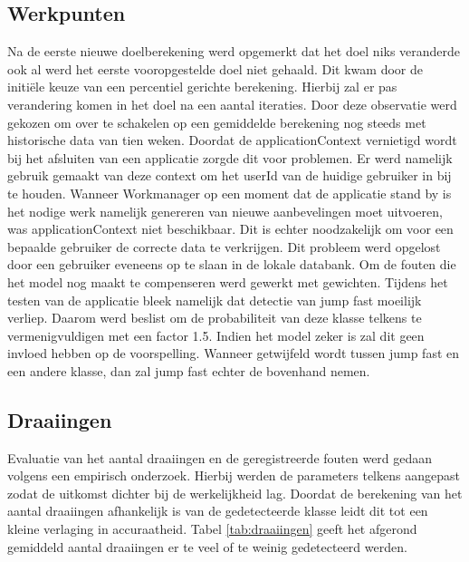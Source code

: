 \subsection{Werkpunten}
Na de eerste nieuwe doelberekening werd opgemerkt dat het doel niks veranderde ook al werd het eerste vooropgestelde doel niet gehaald. Dit kwam door de initiële keuze van een percentiel gerichte berekening. Hierbij zal er pas verandering komen in het doel na een aantal iteraties. Door deze observatie werd gekozen om over te schakelen op een gemiddelde berekening nog steeds met historische data van tien weken. 
Doordat de applicationContext vernietigd wordt bij het afsluiten van een applicatie zorgde dit voor problemen. Er werd namelijk gebruik gemaakt van deze context om het userId van de huidige gebruiker in bij te houden. Wanneer Workmanager op een moment dat de applicatie stand by is het nodige werk namelijk genereren van nieuwe aanbevelingen moet uitvoeren, was applicationContext niet beschikbaar. Dit is echter noodzakelijk om voor een bepaalde gebruiker de correcte data te verkrijgen. Dit probleem werd opgelost door een gebruiker eveneens op te slaan in de lokale databank. 
Om de fouten die het model nog maakt te compenseren werd gewerkt met gewichten. Tijdens het testen van de applicatie bleek namelijk dat detectie van jump fast moeilijk verliep. Daarom werd beslist om de probabiliteit van deze klasse telkens te vermenigvuldigen met een factor 1.5. Indien het model zeker is zal dit geen invloed hebben op de voorspelling. Wanneer getwijfeld wordt tussen jump fast en een andere klasse, dan zal jump fast echter de bovenhand nemen.

\subsection{Draaiingen}
Evaluatie van het aantal draaiingen en de geregistreerde fouten werd gedaan volgens een empirisch onderzoek. Hierbij werden de parameters telkens aangepast zodat de uitkomst dichter bij de werkelijkheid lag. Doordat de berekening van het aantal draaiingen afhankelijk is van de gedetecteerde klasse leidt dit tot een kleine verlaging in accuraatheid. Tabel \ref{tab:draaiingen} geeft het afgerond gemiddeld aantal draaiingen er te veel of te weinig gedetecteerd werden.

